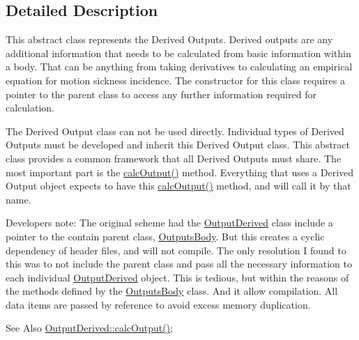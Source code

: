 \subsection{Detailed Description}
This abstract class represents the Derived Outputs. Derived outputs are any additional information that needs to be calculated from basic information within a body. That can be anything from taking derivatives to calculating an empirical equation for motion sickness incidence. The constructor for this class requires a pointer to the parent class to access any further information required for calculation.

The Derived Output class can not be used directly. Individual types of Derived Outputs must be developed and inherit this Derived Output class. This abstract class provides a common framework that all Derived Outputs must share. The most important part is the \hyperlink{classosea_1_1ofreq_1_1_output_derived_a5600a2c7f70052a8bafce79e15e1aa92}{calc\-Output()} method. Everything that uses a Derived Output object expects to have this \hyperlink{classosea_1_1ofreq_1_1_output_derived_a5600a2c7f70052a8bafce79e15e1aa92}{calc\-Output()} method, and will call it by that name.

Developers note\-: The original scheme had the \hyperlink{classosea_1_1ofreq_1_1_output_derived}{Output\-Derived} class include a pointer to the contain parent class, \hyperlink{classosea_1_1ofreq_1_1_outputs_body}{Outputs\-Body}. But this creates a cyclic dependency of header files, and will not compile. The only resolution I found to this was to not include the parent class and pass all the necessary information to each individual \hyperlink{classosea_1_1ofreq_1_1_output_derived}{Output\-Derived} object. This is tedious, but within the reasons of the methods defined by the \hyperlink{classosea_1_1ofreq_1_1_outputs_body}{Outputs\-Body} class. And it allow compilation. All data items are passed by reference to avoid excess memory duplication.

\begin{DoxySeeAlso}{See Also}
\hyperlink{classosea_1_1ofreq_1_1_output_derived_a5600a2c7f70052a8bafce79e15e1aa92}{Output\-Derived\-::calc\-Output()}; 
\end{DoxySeeAlso}


